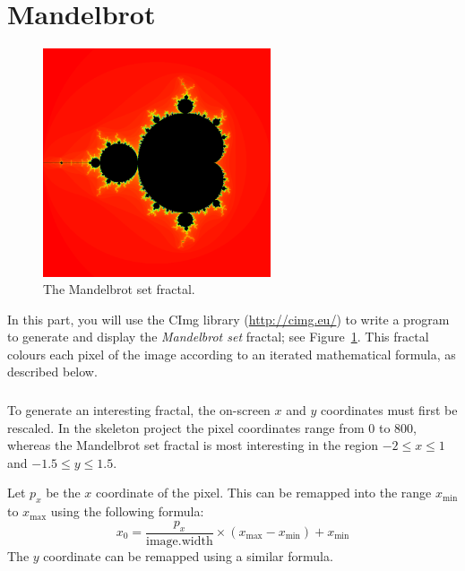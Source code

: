 \part{Mandelbrot}

\begin{figure}
    \begin{center}
        \includegraphics[width=0.6\textwidth]{mandelbrot.png}
    \end{center}
    \caption{The Mandelbrot set fractal.}
    \label{fig:mandelbrot}
\end{figure}

In this part, you will use the CImg library (\url{http://cimg.eu/}) to write a program to generate and display the \emph{Mandelbrot set} fractal; see Figure~\ref{fig:mandelbrot}.
This fractal colours each pixel of the image according to an iterated mathematical formula, as described below.

\section{} \label{core-c-first}

To generate an interesting fractal, the on-screen $x$ and $y$ coordinates must first be rescaled.
In the skeleton project the pixel coordinates range from $0$ to $800$,
whereas the Mandelbrot set fractal is most interesting in the region $-2 \leq x \leq 1$ and $-1.5 \leq y \leq 1.5$.

Let $p_x$ be the $x$ coordinate of the pixel. This can be remapped into the range $x_{\text{min}}$ to $x_{\text{max}}$ using the following formula:
\begin{equation*}
    x_0 = \frac{p_x}{\text{image.width}} \times \left( x_{\text{max}} - x_{\text{min}} \right) + x_{\text{min}}
\end{equation*}
The $y$ coordinate can be remapped using a similar formula.

